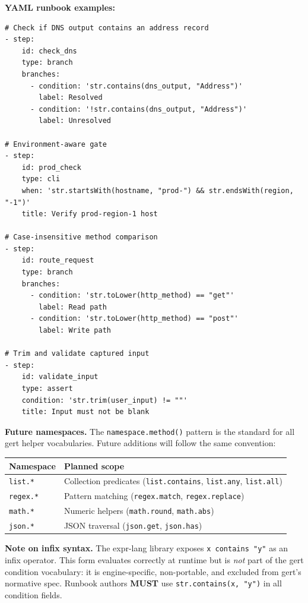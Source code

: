 \textbf{YAML runbook examples:}
\begin{verbatim}
# Check if DNS output contains an address record
- step:
    id: check_dns
    type: branch
    branches:
      - condition: 'str.contains(dns_output, "Address")'
        label: Resolved
      - condition: '!str.contains(dns_output, "Address")'
        label: Unresolved

# Environment-aware gate
- step:
    id: prod_check
    type: cli
    when: 'str.startsWith(hostname, "prod-") && str.endsWith(region, "-1")'
    title: Verify prod-region-1 host

# Case-insensitive method comparison
- step:
    id: route_request
    type: branch
    branches:
      - condition: 'str.toLower(http_method) == "get"'
        label: Read path
      - condition: 'str.toLower(http_method) == "post"'
        label: Write path

# Trim and validate captured input
- step:
    id: validate_input
    type: assert
    condition: 'str.trim(user_input) != ""'
    title: Input must not be blank
\end{verbatim}

\textbf{Future namespaces.}  The \texttt{namespace.method()} pattern is the
standard for all gert helper vocabularies.  Future additions will follow the
same convention:

\begin{center}
\begin{tabular}{ll}
\hline
\textbf{Namespace} & \textbf{Planned scope} \\
\hline
\texttt{list.*}   & Collection predicates (\texttt{list.contains}, \texttt{list.any}, \texttt{list.all}) \\
\texttt{regex.*}  & Pattern matching (\texttt{regex.match}, \texttt{regex.replace}) \\
\texttt{math.*}   & Numeric helpers (\texttt{math.round}, \texttt{math.abs}) \\
\texttt{json.*}   & JSON traversal (\texttt{json.get}, \texttt{json.has}) \\
\hline
\end{tabular}
\end{center}

\textbf{Note on infix syntax.}  The expr-lang library exposes \texttt{x contains "y"}
as an infix operator.  This form evaluates correctly at runtime but is
\emph{not} part of the gert condition vocabulary: it is engine-specific,
non-portable, and excluded from gert's normative spec.  Runbook authors
\textbf{MUST} use \texttt{str.contains(x, "y")} in all condition fields.

